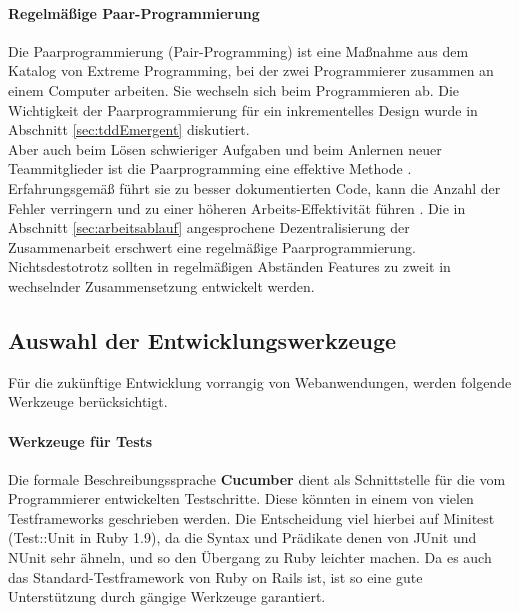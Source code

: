 \paragraph{Regelmäßige Paar-Programmierung} Die Paarprogrammierung (Pair-Programming) ist eine Maßnahme aus dem Katalog von Extreme Programming, bei der zwei Programmierer zusammen an einem Computer arbeiten. Sie wechseln sich beim Programmieren ab. Die Wichtigkeit der Paarprogrammierung für ein inkrementelles Design wurde in Abschnitt \ref{sec:tddEmergent} diskutiert.\\ Aber auch beim Lösen schwieriger Aufgaben und beim Anlernen neuer Teammitglieder ist die Paarprogramming eine effektive Methode \citep[S. 9]{hulkko_multiple_2005}. Erfahrungsgemäß führt sie zu besser dokumentierten Code, kann die Anzahl der Fehler verringern und zu einer höheren Arbeits-Effektivität führen \citep{hulkko_multiple_2005}.
Die in Abschnitt \ref{sec:arbeitsablauf} angesprochene Dezentralisierung der Zusammenarbeit erschwert eine regelmäßige Paarprogrammierung. Nichtsdestotrotz sollten in regelmäßigen Abständen Features zu zweit in wechselnder Zusammensetzung entwickelt werden.


\subsection{Auswahl der Entwicklungswerkzeuge}
\label{sec:devtools}

Für die zukünftige Entwicklung vorrangig von Webanwendungen, werden folgende Werkzeuge berücksichtigt.

\paragraph{Werkzeuge für Tests} Die formale Beschreibungssprache \textbf{Cucumber} dient als Schnittstelle für die vom Programmierer entwickelten Testschritte. Diese könnten in einem von vielen Testframeworks geschrieben werden. Die Entscheidung viel hierbei auf Minitest (Test::Unit in Ruby 1.9), da die Syntax und Prädikate denen von JUnit und NUnit sehr ähneln, und so den Übergang zu Ruby leichter machen. Da es auch das Standard-Testframework von Ruby on Rails ist, ist so eine gute Unterstützung durch gängige Werkzeuge garantiert.

